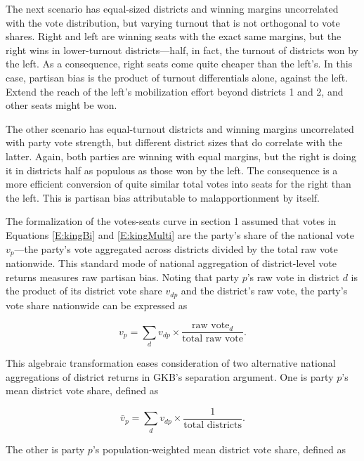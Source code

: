 \documentclass[letter,12pt]{article}
\begin{document}
The next scenario has equal-sized districts and winning margins uncorrelated with the vote distribution, but varying turnout that is not orthogonal to vote shares. Right and left are winning seats with the exact same margins, but the right wins in lower-turnout districts---half, in fact, the turnout of districts won by the left. As a consequence, right seats come quite cheaper than the left's. In this case, partisan bias is the product of turnout differentials alone, against the left. Extend the reach of the left's mobilization effort beyond districts 1 and 2, and other seats might be won. 

The other scenario has equal-turnout districts and winning margins uncorrelated with party vote strength, but different district sizes that do correlate with the latter. Again, both parties are winning with equal margins, but the right is doing it in districts half as populous as those won by the left. The consequence is a more efficient conversion of quite similar total votes into seats for the right than the left. This is partisan bias attributable to malapportionment by itself.  

The formalization of the votes-seats curve in section 1 assumed that votes in Equations \ref{E:kingBi} and \ref{E:kingMulti} are the party's share of the national vote $v_p$---the party's vote aggregated across districts divided by the total raw vote nationwide. This standard mode of national aggregation of district-level vote returns measures raw partisan bias. Noting that party $p$'s raw vote in district $d$ is the product of its district vote share $v_{dp}$ and the district's raw vote, the party's vote share nationwide can be expressed as 

\begin{equation}
v_p  = \sum_d v_{dp} \times \frac{\text{raw vote}_d}{\text{total raw vote}}.  %
\end{equation}

\noindent This algebraic transformation eases consideration of two alternative national aggregations of district returns in GKB's separation argument. One is party $p$'s mean district vote share, defined as

\begin{equation}
\bar{v}_p  = \sum_d v_{dp} \times \frac{1}{\text{total districts}}. %
\end{equation}

\noindent The other is party $p$'s population-weighted mean district vote share, defined as
\end{document}
